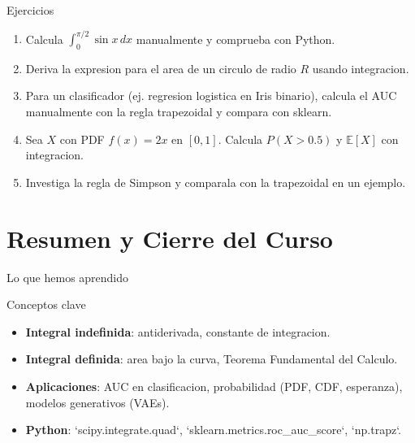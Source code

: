 \documentclass[aspectratio=169, 10pt, xcolor=table]{beamer}
\begin{document}
\begin{frame}{Ejercicios}
    \begin{enumerate}
        \item Calcula $\int_0^{\pi/2} \sin x\,dx$ manualmente y comprueba con Python.
        \item Deriva la expresion para el area de un circulo de radio $R$ usando integracion.
        \item Para un clasificador (ej. regresion logistica en Iris binario), calcula el AUC manualmente con la regla trapezoidal y compara con sklearn.
        \item Sea $X$ con PDF $f(x)=2x$ en $[0,1]$. Calcula $P(X>0.5)$ y $\mathbb{E}[X]$ con integracion.
        \item Investiga la regla de Simpson y comparala con la trapezoidal en un ejemplo.
    \end{enumerate}
\end{frame}

\section{Resumen y Cierre del Curso}

\begin{frame}{Lo que hemos aprendido}
    \begin{exampleblock}{Conceptos clave}
        \begin{itemize}
            \item \textbf{Integral indefinida}: antiderivada, constante de integracion.
            \item \textbf{Integral definida}: area bajo la curva, Teorema Fundamental del Calculo.
            \item \textbf{Aplicaciones}: AUC en clasificacion, probabilidad (PDF, CDF, esperanza), modelos generativos (VAEs).
            \item \textbf{Python}: `scipy.integrate.quad`, `sklearn.metrics.roc_auc_score`, `np.trapz`.
        \end{itemize}
    \end{exampleblock}
\end{frame}
\end{document}
